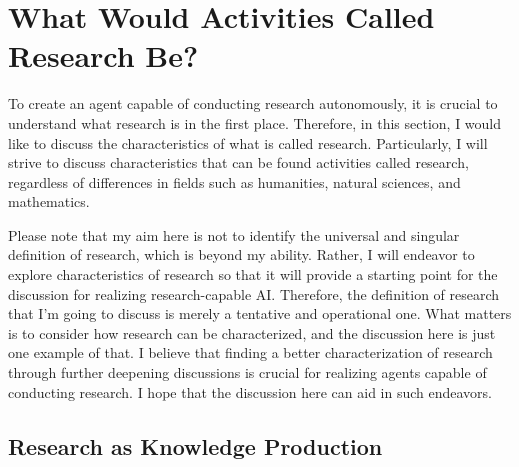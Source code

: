 \section{What Would Activities Called Research Be?}
\label{section-what-is-research}

To create an agent capable of conducting research autonomously, it is crucial to understand what research is in the first place. Therefore, in this section, I would like to discuss the characteristics of what is called research. Particularly, I will strive to discuss characteristics that can be found activities called research, regardless of differences in fields such as humanities, natural sciences, and mathematics.

Please note that my aim here is not to identify the universal and singular definition of research, which is beyond my ability. Rather, I will endeavor to explore characteristics of research so that it will provide a starting point for the discussion for realizing research-capable AI. Therefore, the definition of research that I'm going to discuss is merely a tentative and operational one. What matters is to consider how research can be characterized, and the discussion here is just one example of that. I believe that finding a better characterization of research through further deepening discussions is crucial for realizing agents capable of conducting research. I hope that the discussion here can aid in such endeavors.



\subsection{Research as Knowledge Production}



